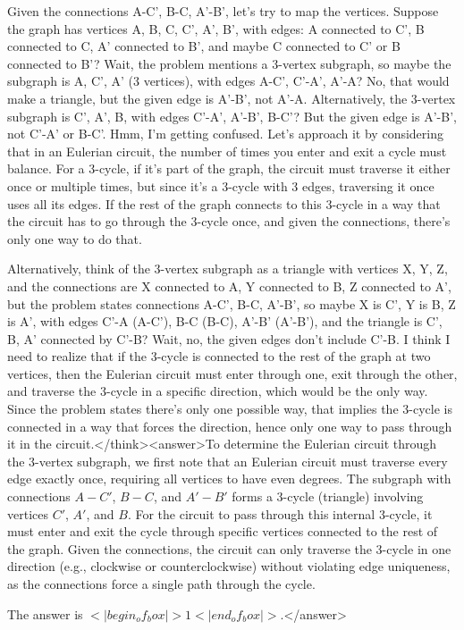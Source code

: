 Given the connections A-C', B-C, A'-B', let's try to map the vertices. Suppose the graph has vertices A, B, C, C', A', B', with edges: A connected to C', B connected to C, A' connected to B', and maybe C connected to C' or B connected to B'? Wait, the problem mentions a 3-vertex subgraph, so maybe the subgraph is A, C', A' (3 vertices), with edges A-C', C'-A', A'-A? No, that would make a triangle, but the given edge is A'-B', not A'-A. Alternatively, the 3-vertex subgraph is C', A', B, with edges C'-A', A'-B', B-C'? But the given edge is A'-B', not C'-A' or B-C'. Hmm, I'm getting confused. Let's approach it by considering that in an Eulerian circuit, the number of times you enter and exit a cycle must balance. For a 3-cycle, if it's part of the graph, the circuit must traverse it either once or multiple times, but since it's a 3-cycle with 3 edges, traversing it once uses all its edges. If the rest of the graph connects to this 3-cycle in a way that the circuit has to go through the 3-cycle once, and given the connections, there's only one way to do that. 

Alternatively, think of the 3-vertex subgraph as a triangle with vertices X, Y, Z, and the connections are X connected to A, Y connected to B, Z connected to A', but the problem states connections A-C', B-C, A'-B', so maybe X is C', Y is B, Z is A', with edges C'-A (A-C'), B-C (B-C), A'-B' (A'-B'), and the triangle is C', B, A' connected by C'-B? Wait, no, the given edges don't include C'-B. I think I need to realize that if the 3-cycle is connected to the rest of the graph at two vertices, then the Eulerian circuit must enter through one, exit through the other, and traverse the 3-cycle in a specific direction, which would be the only way. Since the problem states there's only one possible way, that implies the 3-cycle is connected in a way that forces the direction, hence only one way to pass through it in the circuit.</think><answer>To determine the Eulerian circuit through the 3-vertex subgraph, we first note that an Eulerian circuit must traverse every edge exactly once, requiring all vertices to have even degrees. The subgraph with connections \(A-C'\), \(B-C\), and \(A'-B'\) forms a 3-cycle (triangle) involving vertices \(C'\), \(A'\), and \(B\). For the circuit to pass through this internal 3-cycle, it must enter and exit the cycle through specific vertices connected to the rest of the graph. Given the connections, the circuit can only traverse the 3-cycle in one direction (e.g., clockwise or counterclockwise) without violating edge uniqueness, as the connections force a single path through the cycle.  

The answer is \(<|begin_of_box|>1<|end_of_box|>\).</answer>